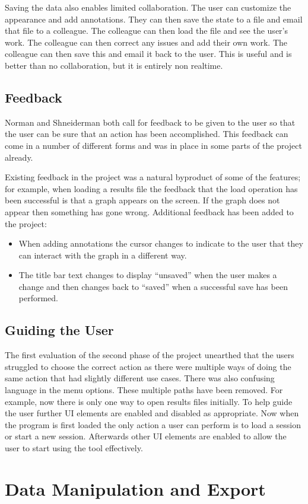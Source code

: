 Saving the data also enables limited collaboration.  The user can customize the appearance and add annotations.  They can then save the state to a file and email that file to a colleague.  The colleague can then load the file and see the user's work.  The colleague can then correct any issues and add their own work.  The colleague can then save this and email it back to the user.  This is useful and is better than no collaboration, but it is entirely non realtime.

\subsection{Feedback}
Norman and Shneiderman both call for feedback to be given to the user so that the user can be sure that an action has been accomplished.  This feedback can come in a number of different forms and was in place in some parts of the project already.

Existing feedback in the project was a natural byproduct of some of the features; for example, when loading a results file the feedback that the load operation has been successful is that a graph appears on the screen. If the graph does not appear then something has gone wrong.  Additional feedback has been added to the project:
\begin{itemize}
\item When adding annotations the cursor changes to indicate to the user that they can interact with the graph in a different way.
\item The title bar text changes to display ``unsaved'' when the user makes a change and then changes back to ``saved'' when a successful save has been performed.
\end{itemize}

\subsection{Guiding the User}

The first evaluation of the second phase of the project unearthed that the users struggled to choose the correct action as there were multiple ways of doing the same action that had slightly different use cases.  There was also confusing language in the menu options.  These multiple paths have been removed. For example, now there is only one way to open results files initially.  To help guide the user further \ac{UI} elements are enabled and disabled as appropriate.  Now when the program is first loaded the only action a user can perform is to load a session or start a new session.  Afterwards other \ac{UI} elements are enabled to allow the user to start using the tool effectively.

\section{Data Manipulation and Export}
